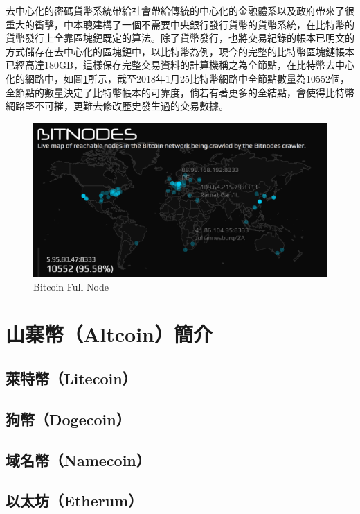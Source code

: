 	去中心化的密碼貨幣系統帶給社會帶給傳統的中心化的金融體系以及政府帶來了很重大的衝擊，中本聰建構了一個不需要中央銀行發行貨幣的貨幣系統，在比特幣的貨幣發行上全靠區塊鏈既定的算法。除了貨幣發行，也將交易紀錄的帳本已明文的方式儲存在去中心化的區塊鏈中，以比特幣為例，現今的完整的比特幣區塊鏈帳本已經高達180GB，這樣保存完整交易資料的計算機稱之為全節點，在比特幣去中心化的網路中，如圖\ref{bitcoinfullnode}所示，截至2018年1月25比特幣網路中全節點數量為10552個\parencite{bitcoinfullnode}，全節點的數量決定了比特幣帳本的可靠度，倘若有著更多的全結點，會使得比特幣網路堅不可摧，更難去修改歷史發生過的交易數據。

	\begin{figure}
		\centering
		\includegraphics[width = .9\textwidth]{bitcoinfullnode.png}
		\caption{Bitcoin Full Node\parencite{bitcoinfullnode}}\label{bitcoinfullnode}
	\end{figure}

	\section{山寨幣（Altcoin）簡介}

		\subsection{萊特幣（Litecoin）}

		\subsection{狗幣（Dogecoin）}

		\subsection{域名幣（Namecoin）}

		\subsection{以太坊（Etherum）}

